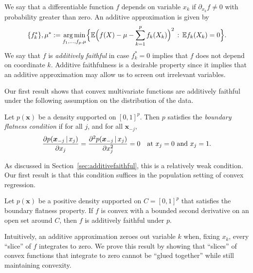 We say that a differentiable function $f$ depends on variable $x_k$ if
$\partial_{x_k} f \neq 0$ with probability greater than zero.  An additive approximation is given by
\begin{equation}
\{f_k^*\}, \mu^* := \mathop{\text{\rm arg\,min}}_{f_1,\ldots, f_p, \mu} \Bigl\{ 
             {\mathbb E} \Bigl( f(X) - \mu - \sum_{k=1}^p f_k(X_k)\Bigr)^2 
         \,:\, {\mathbb E} f_k(X_k) = 0 \Bigr\}.
\end{equation}
We say that $f$ is \textit{additively faithful} in case $f^*_k = 0$
implies that $f$ does not depend on coordinate $k$.
Additive faithfulness is a desirable property
since it implies that an additive approximation may allow us to 
screen out irrelevant variables.

Our first result shows that convex multivariate functions are
additively faithful
under the following assumption on the distribution of the data.
\begin{definition}
  Let $p(\mathbf{x})$ be a density supported on $[0,1]^p$.  Then $p$
  satisfies the \emph{boundary flatness condition} if for all $j$, and
  for all $\mathbf{x}_{-j}$,
\[
\frac{\partial p(\mbox{\boldmath $x$}_{-j} {\,|\,} x_j)}{\partial x_j}  =  
\frac{\partial^2 p(\mbox{\boldmath $x$}_{-j} {\,|\,} x_j)}{\partial x_j^2} = 0
\quad \textrm{at $x_j = 0$ and $x_j = 1$}.
\]
\end{definition}

As discussed in Section~\ref{sec:additivefaithful}, this is a relatively weak condition. 
Our first result is that this condition suffices in the population
setting of convex regression.

\begin{stheorem}
  Let $p(\mathbf{x})$ be a positive density supported on $C=[0,1]^p$ that
  satisfies the boundary flatness property. If $f$ is convex with a bounded second derivative on an open set around $C$, then $f$ is additively faithful under $p$.
\end{stheorem}


Intuitively, an additive approximation zeroes out variable $k$ when, fixing $x_k$, every
``slice'' of $f$ integrates to zero. We prove this result
by showing that ``slices'' of convex
functions that integrate to zero cannot be ``glued together'' while
still maintaining convexity.

